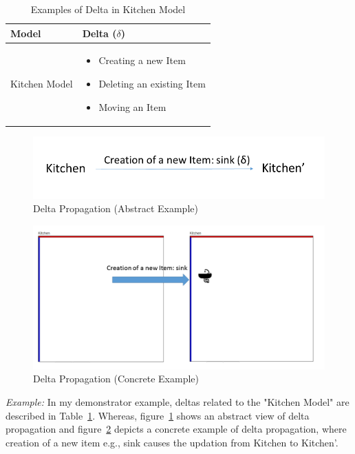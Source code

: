 \begin{table}
	\centering	
	\begin{tabular}{|p{5cm}|p{10cm}|}
		\hline
		\rowcolor[gray]{.8}	
		\textbf{Model} & \textbf{Delta ($\delta$)} \\
		\hline
		Kitchen Model & 
		\begin{itemize}
			\item Creating a new Item
			\item Deleting an existing Item
			\item Moving an Item
		\end{itemize}\\
		\hline				
		
	\end{tabular}
	\label{tab:Examples_of_Delta}
	\caption{Examples of Delta in Kitchen Model}
\end{table}

\begin{figure}
	\includegraphics[width=1\textwidth]{figures/Delta_Abstract}
	\caption{Delta Propagation (Abstract Example)}
	\label{fig:DeltaPropagation_Abstract}
\end{figure}
\begin{figure}
	\includegraphics[width=1\textwidth]{figures/Delta_Concrete}
	\caption{Delta Propagation (Concrete Example)}
	\label{fig:DeltaPropagation_Concrete}
\end{figure}

\textit{Example:} In my demonstrator example, deltas related to the "Kitchen Model" are described in Table~\ref{tab:Examples_of_Delta}. Whereas, figure~\ref{fig:DeltaPropagation_Abstract} shows an abstract view of delta propagation and figure~\ref{fig:DeltaPropagation_Concrete} depicts a concrete example of delta propagation, where creation of a new item e.g., sink causes the updation from Kitchen to Kitchen'.\\


